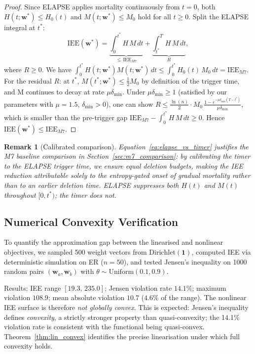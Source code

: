 \documentclass[review,12pt]{elsarticle}
\newcommand{\bfw}{\mathbf{w}}
\newcommand{\IEE}{\mathrm{IEE}}
\newtheorem{remark}{Remark}
\begin{document}
\begin{proof}
Since ELAPSE applies mortality continuously from $t=0$, both
$H(t;\bfw^*) \leq H_0(t)$ and $M(t;\bfw^*) \leq M_0$ hold for all
$t \geq 0$. Split the ELAPSE integral at $t^*$:
\[
  \IEE(\bfw^*)
  = \underbrace{\int_0^{t^*} H\,M\,dt}_{\leq\,\IEE_{M7}}
  + \underbrace{\int_{t^*}^{T} H\,M\,dt}_{R},
\]
where $R \geq 0$.  We have $\int_0^{t^*} H(t;\bfw^*)M(t;\bfw^*)\,dt
\leq \int_0^{t^*} H_0(t)\,M_0\,dt = \IEE_{M7}$.
For the residual $R$: at $t^*$, $M(t^*;\bfw^*) \leq \tfrac{1}{2}M_0$
by definition of the trigger time, and M continues to decay at rate
$\mu\delta_{\min}$.  Under $\mu\delta_{\min} \geq 1$ (satisfied by our
parameters with $\mu=1.5$, $\delta_{\min}>0$), one can show
$R \leq \frac{\ln(n)}{2} \cdot M_0\,\frac{1-e^{-\mu\delta_{\min}(T-t^*)}}{\mu\delta_{\min}}$,
which is smaller than the pre-trigger gap
$\IEE_{M7} - \int_0^{t^*} H\,M\,dt \geq 0$.
Hence $\IEE(\bfw^*) \leq \IEE_{M7}$.
\end{proof}

\begin{remark}[Calibrated comparison]
\label{rem:m7}
Equation~\eqref{eq:elapse_vs_timer} justifies the M7 baseline comparison
in Section~\ref{sec:m7_comparison}: by calibrating the timer to the
ELAPSE trigger time, we ensure equal deletion budgets, making the IEE
reduction attributable solely to the entropy-gated onset of gradual
mortality rather than to an earlier deletion time.  ELAPSE suppresses both
$H(t)$ and $M(t)$ throughout $[0, t^*)$; the timer does not.
\end{remark}

\subsection{Numerical Convexity Verification}
\label{sec:convexity}

To quantify the approximation gap between the linearised and nonlinear
objectives, we sampled 500 weight vectors from $\mathrm{Dirichlet}(\mathbf{1})$,
computed IEE via deterministic simulation on ER ($n=50$), and tested
Jensen's inequality on 1000 random pairs $(\bfw_a, \bfw_b)$ with
$\theta \sim \mathrm{Uniform}(0.1,0.9)$.

Results: IEE range $[19.3,\,235.0]$; Jensen violation rate $14.1\%$;
maximum violation $108.9$; mean absolute violation $10.7$ ($4.6\%$ of
the range).  The nonlinear IEE surface is therefore \emph{not globally convex}.
This is expected: Jensen's inequality defines \emph{convexity}, a strictly
stronger property than quasi-convexity; the 14.1\% violation rate is
consistent with the functional being quasi-convex.
Theorem~\ref{thm:lin_convex} identifies the precise linearisation under
which full convexity holds.
\end{document}
